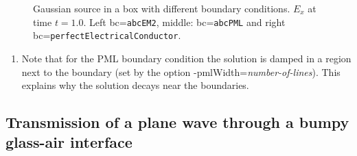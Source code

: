 {
\begin{figure}[hbt]
\newcommand{\figWidth}{5.5cm}
\newcommand{\trimfig}[2]{\trimFig{#1}{#2}{0.1}{0.05}{.05}{.05}}
\begin{center}
\end{center}
\caption{Gaussian source in a box with different boundary conditions. $E_x$ at time $t=1.0$. Left bc={\tt abcEM2}, middle: bc={\tt abcPML} and
right bc={\tt perfectElectricalConductor}. }
\label{fig:rbcBox}
\end{figure}
}

\begin{enumerate}
 \item Note that for the PML boundary condition the solution is damped in a region 
  next to the boundary (set by the option -pmlWidth={\em number-of-lines}). This explains why the solution decays near the boundaries.
\end{enumerate}


\clearpage
\subsection{Transmission of a plane wave through a bumpy glass-air interface} \label{sec:scatBump2d}

